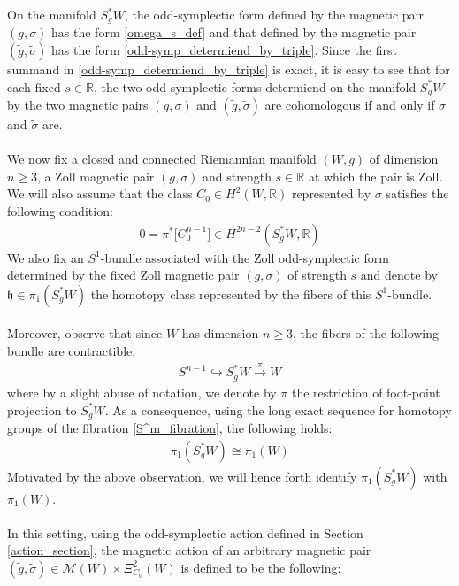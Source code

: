 \documentclass[11pt]{amsart}
\theoremstyle{plain}
\theoremstyle{definition}
\theoremstyle{remark}
\begin{document}
On the manifold $S_g^*W$, the odd-symplectic form defined by the magnetic pair $(g,\sigma)$ has the form \eqref{omega_s_def} and that defined by the magnetic pair $(\tilde g,\tilde \sigma)$ has the form \eqref{odd-symp_determiend_by_triple}. Since the first summand in \eqref{odd-symp_determiend_by_triple} is exact, it is easy to see that for each fixed $s\in \mathbb{R}$, the two odd-symplectic forms determiend on the manifold $S_g^*W$ by the two magnetic pairs $(g,\sigma)$ and $(\tilde g,\tilde \sigma)$ are cohomologous if and only if $\sigma$ and $\tilde \sigma$ are.\\
\\
We now fix a closed and connected Riemannian manifold $(W,g)$ of dimension $n\geq 3$, a Zoll magnetic pair $(g,\sigma)$ and strength $s \in \mathbb{R}$ at which the pair is Zoll. We will also assume that the class $C_0 \in H^2(W,\mathbb{R})$ represented by $\sigma$ satisfies the following condition:
\begin{align}\label{cohomology_assumption_mag_systems}
   0=\pi^*\big[C^{n-1}_0\big] \in H^{2n-2}(S^*_gW,\mathbb{R})
\end{align}
We also fix an $S^1$-bundle associated with the Zoll odd-symplectic form determined by the fixed Zoll magnetic pair $(g,\sigma)$ of strength $s$ and denote by $\mathfrak{h} \in \pi_1(S_g^*W)$ the homotopy class represented by the fibers of this $S^1$-bundle.\\
\\
Moreover, observe that since $W$ has dimension $n\geq 3$, the fibers of the following bundle are contractible:
\begin{align}\label{S^m_fibration}
    S^{n-1}\hookrightarrow S_g^*W \xrightarrow{\pi} W
\end{align}
where by a slight abuse of notation, we denote by $\pi$ the restriction of foot-point projection to $S_g^*W$. As a consequence, using the long exact sequence for homotopy groups of the fibration \eqref{S^m_fibration}, the following holds:
\begin{align}
    \pi_1(S_g^*W) \cong \pi_1(W)
\end{align}
Motivated by the above observation, we will hence forth identify $ \pi_1(S_g^*W)$ with $ \pi_1(W)$.\\
\\
In this setting, using the odd-symplectic action defined in Section \ref{action_section}, the magnetic action of an arbitrary magnetic pair $(\tilde g,\tilde \sigma) \in \mathcal{M}(W) \times \Xi^2_{C_0}(W)$ is defined to be the following:
\end{document}
